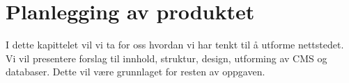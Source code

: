 \cleardoublepage
\chapter{Planlegging av produktet}
\label{chap:design} 









I dette kapittelet vil vi ta for oss hvordan vi har tenkt til å utforme nettstedet. Vi vil presentere forslag til innhold, struktur, design, utforming av CMS og databaser. Dette vil være grunnlaget for resten av oppgaven.

